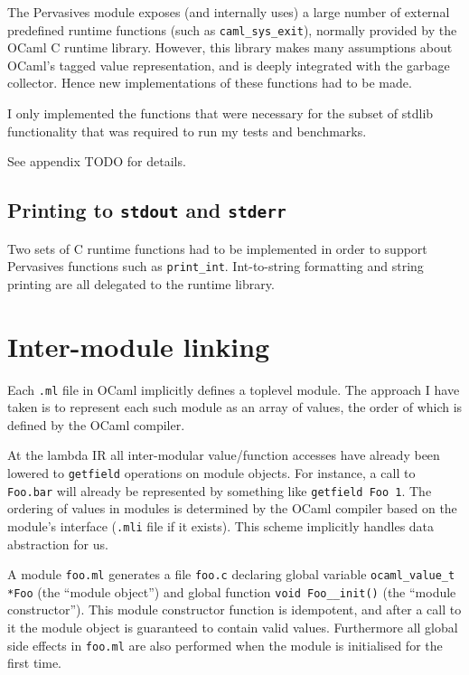 \documentclass[12pt,a4paper,twoside,openright]{report}
\begin{document}
The Pervasives module exposes (and internally uses) a large number of external predefined runtime functions (such as \lstinline!caml_sys_exit!), normally provided by the OCaml C runtime library. However, this library makes many assumptions about OCaml's tagged value representation, and is deeply integrated with the garbage collector. Hence new implementations of these functions had to be made.

I only implemented the functions that were necessary for the subset of stdlib functionality that was required to run my tests and benchmarks.

See appendix TODO for details.

\subsection{Printing to \texttt{stdout} and \texttt{stderr}}

Two sets of C runtime functions had to be implemented in order to support Pervasives functions such as \lstinline!print_int!. Int-to-string formatting and string printing are all delegated to the runtime library.

\section{Inter-module linking}

Each \lstinline!.ml! file in OCaml implicitly defines a toplevel module. The approach I have taken is to represent each such module as an array of values, the order of which is defined by the OCaml compiler.

At the lambda IR all inter-modular value/function accesses have already been lowered to \lstinline!getfield! operations on module objects. For instance, a call to \lstinline!Foo.bar! will already be represented by something like \lstinline!getfield Foo 1!. The ordering of values in modules is determined by the OCaml compiler based on the module's interface (\lstinline!.mli! file if it exists). This scheme implicitly handles data abstraction for us.

A module \lstinline!foo.ml! generates a file \lstinline!foo.c! declaring global variable \lstinline!ocaml_value_t *Foo! (the ``module object'') and global function \lstinline!void Foo__init()! (the ``module constructor''). This module constructor function is idempotent, and after a call to it the module object is guaranteed to contain valid values. Furthermore all global side effects in \lstinline!foo.ml! are also performed when the module is initialised for the first time.
\end{document}

